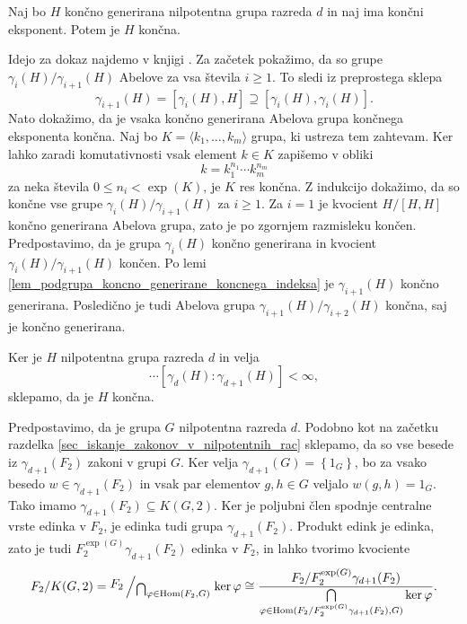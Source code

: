 \begin{lema}
\label{lem_koncnogenerirana_nilpotentna}
Naj bo $H$ končno generirana nilpotentna grupa razreda $d$ in naj ima končni eksponent. Potem je $H$ končna.
\end{lema}
\begin{dokaz}
Idejo za dokaz najdemo v knjigi \cite[str.~13--14]{Segal_1983}.
Za začetek pokažimo, da so grupe $\gamma_{i}(H) / \gamma_{i + 1}(H)$ Abelove za vsa števila $i \ge 1$. To sledi iz preprostega sklepa \begin{equation*}
\gamma_{i + 1}(H) = [\gamma_i(H), H] \supseteq [\gamma_i(H), \gamma_i(H)].
\end{equation*}
Nato dokažimo, da je vsaka končno generirana Abelova grupa končnega eksponenta končna. Naj bo $K = \langle k_1, \ldots, k_m \rangle$ grupa, ki ustreza tem zahtevam.
Ker lahko zaradi komutativnosti vsak element $k \in  K$ zapišemo v obliki \begin{equation*}
k = k_1^{n_1} \cdots k_m^{n_m}
\end{equation*}  
za neka števila $0 \le n_i < \exp(K)$, je $K$ res končna. Z indukcijo dokažimo, da so končne vse grupe $\gamma_{i}(H) / \gamma_{i + 1}(H)$ za $i \ge 1$. Za $i = 1$ je kvocient $H / [H, H]$ končno generirana Abelova grupa, zato je po zgornjem razmisleku končen. Predpostavimo, da je grupa $\gamma_{i}(H)$ končno generirana in kvocient $\gamma_{i}(H) / \gamma_{i + 1}(H)$ končen. Po lemi \ref{lem_podgrupa_koncno_generirane_koncnega_indeksa} je 
$\gamma_{i + 1}(H)$ končno generirana. Posledično je tudi Abelova grupa $\gamma_{i + 1}(H) / \gamma_{i + 2}(H)$ končna, saj je končno generirana. 


 Ker je $H$ nilpotentna grupa razreda $d$ in velja \begin{equation*}
    [H : \gamma_2(H)] [\gamma_2(H) : \gamma_3(H)] \cdots [\gamma_{d}(H) : \gamma_{d + 1}(H)]  < \infty,
    \end{equation*}  
    sklepamo, da je $H$ končna.
\end{dokaz}

Predpostavimo, da je grupa $G$ nilpotentna razreda $d$. Podobno kot na začetku razdelka \ref{sec_iskanje_zakonov_v_nilpotentnih_rac} sklepamo, da so vse besede iz $\gamma_{d+1}(F_2)$ zakoni v grupi $G$. Ker velja $\gamma_{d+1}(G) = \left\{ 1_G \right\}$, bo za vsako besedo $w \in \gamma_{d+1}(F_2)$ in vsak par elementov $g ,h \in G$ veljalo $w(g,h) = 1_{G}$.
Tako imamo $\gamma_{d+1}(F_2) \subseteq K(G, 2)$.
Ker je poljubni člen spodnje centralne vrste edinka v $F_2$, je edinka tudi grupa $\gamma_{d+ 1}(F_2)$.
Produkt edink je edinka, zato je tudi $F_2^{\exp(G)} \gamma_{d+ 1}(F_2)$ edinka v $F_2$, in lahko tvorimo kvociente 
\begin{equation*}
   F_2 / K(G, 2) = \bigslant{F_2}{\bigcap_{\varphi \in \operatorname{Hom}(F_2, G)}}  \ker \varphi \cong \dfrac{{F_2} / {F_2^{\exp(G)}\gamma_{d+1}(F_2)}}{ \bigcap\limits_{\varphi \in \operatorname{Hom}({F_2} / {F_2^{\exp(G)}\gamma_{d+1}(F_2)}, G)} \ker \varphi  }.
\end{equation*}

